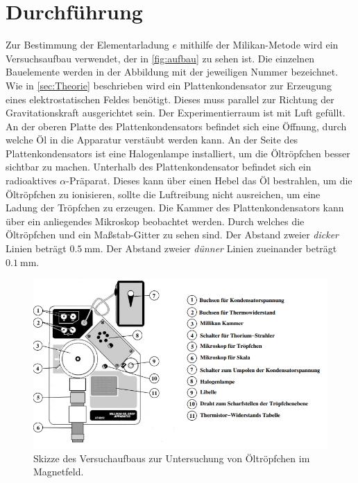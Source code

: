 \section{Durchführung}
\label{sec:Durchführung}
Zur Bestimmung der Elementarladung $e$ mithilfe der Milikan-Metode wird ein Versuchsaufbau verwendet, der in \autoref{fig:aufbau} zu sehen ist. Die einzelnen Bauelemente werden in der Abbildung 
mit der jeweiligen Nummer bezeichnet. Wie in \autoref{sec:Theorie} beschrieben wird ein Plattenkondensator zur Erzeugung eines elektrostatischen Feldes benötigt. Dieses 
muss parallel zur Richtung der Gravitationskraft ausgerichtet sein. Der Experimentierraum ist mit Luft gefüllt. An der oberen Platte des Plattenkondensators befindet sich eine 
Öffnung, durch welche Öl in die Apparatur verstäubt werden kann. An der Seite des Plattenkondensators ist eine Halogenlampe installiert, um die Öltröpfchen besser sichtbar zu 
machen.
Unterhalb des Plattenkondensator befindet sich ein radioaktives $\alpha$-Präparat. Dieses kann über einen Hebel das Öl bestrahlen, um die Öltröpfchen zu ionisieren, sollte 
die Luftreibung nicht ausreichen, um eine Ladung der Tröpfchen zu erzeugen. Die Kammer des Plattenkondensators kann über ein anliegendes Mikroskop beobachtet werden. 
Durch welches die Öltröpfchen und ein Maßstab-Gitter zu sehen sind.
Der Abstand zweier \textit{dicker} Linien beträgt $\qty{0.5}{\milli\metre}$. Der Abstand zweier \textit{dünner} Linien zueinander beträgt 
$\qty{0.1}{\milli\metre}$.

\begin{figure}
    \centering
    \includegraphics[width = \textwidth]{content/Aufbau.PNG}
    \caption{Skizze des Versuchaufbaus zur Untersuchung von Öltröpfchen im Magnetfeld. \cite{v503}}
    \label{fig:aufbau}
\end{figure}

